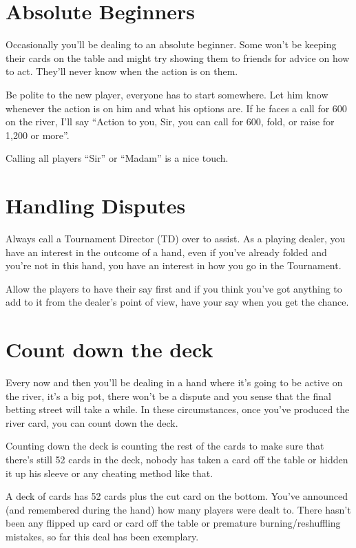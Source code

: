 \section{Absolute Beginners}

Occasionally you'll be dealing to an absolute beginner. Some won't be
keeping their cards on the table and might try showing them to friends
for advice on how to act. They'll never know when the action is on them.

Be polite to the new player, everyone has to start somewhere. Let him
know whenever the action is on him and what his options are. If he
faces a call for 600 on the river, I'll say ``Action to you, Sir, you
can call for 600, fold, or raise for 1,200 or more''.

Calling all players ``Sir'' or ``Madam'' is a nice touch.

\section{Handling Disputes}

Always call a Tournament Director (TD) over to assist. As a playing
dealer, you have an interest in the outcome of a hand, even
if you've already folded and you're not in this hand, you have
an interest in how you go in the Tournament.

Allow the players to have their say first and if you think you've
got anything to add to it from the dealer's point of view, have
your say when you get the chance.

\section{Count down the deck}

Every now and then you'll be dealing in a hand where it's going to be
active on the river, it's a big pot, there won't be a dispute and you
sense that the final betting street will take a while. In these
circumstances, once you've produced the river card, you can count
down the deck.

Counting down the deck is counting the rest of the cards to make
sure that there's still 52 cards in the deck, nobody has
taken a card off the table or hidden it up his sleeve or any
cheating method like that.

A deck of cards has 52 cards plus the cut card on the bottom.
You've announced (and remembered during the hand) how many players
were dealt to. There hasn't been any flipped up card or card
off the table or premature burning/reshuffling mistakes, so far
this deal has been exemplary.

